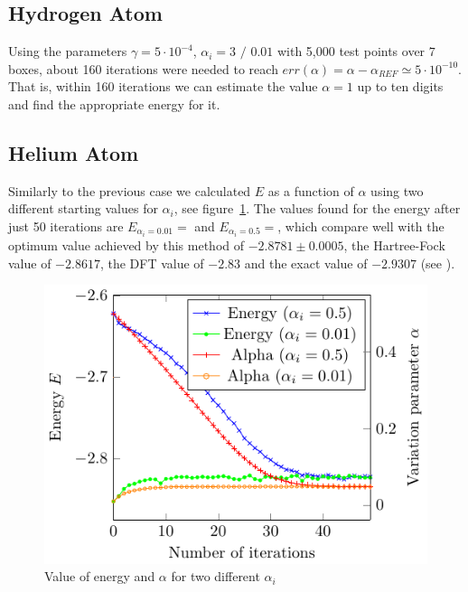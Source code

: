 \subsection{Hydrogen Atom}
Using the parameters
$\gamma = 5\cdot 10^{-4}$, $\alpha_i = 3 \text{~/~}0.01$ with 5,000
test points over $7$ boxes, about 160 iterations were needed to reach
$err(\alpha) = \alpha-\alpha_{REF} \simeq 5 \cdot 10^{-10}$. That is, within 160
iterations we can estimate the value $\alpha=1$ up to ten digits and find the appropriate energy for it.


\subsection{Helium Atom}

Similarly to the previous case we calculated $E$ as a function of $\alpha$
using two different starting values for $\alpha_i$, see figure~\ref{fig:He_it}.
The values found for the energy after just 50 iterations are
$E_{\alpha_i = 0.01} =  $ and $E_{\alpha_i = 0.5} =  $, which
compare well with the optimum value achieved by this method
of $-2.8781 \pm 0.0005$, the Hartree-Fock value of $-2.8617$,
the DFT value of $-2.83$ and the exact value of $-2.9307$ (see \cite{JosBook}). %

\begin{figure}
  \begin{center}
  \includegraphics[scale=1 ]{graphs/he-e-alpha-iterations.pdf}
  \caption{
	Value of energy and $\alpha$ for two different $\alpha_i$
  	}
  \label{fig:He_it}
  \end{center}
\end{figure}
